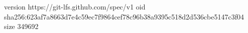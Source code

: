 version https://git-lfs.github.com/spec/v1
oid sha256:623af7a8663d7e4c59ec7f9864cef78c96b38a9395c518d2d536cbe5147c3f04
size 349692
